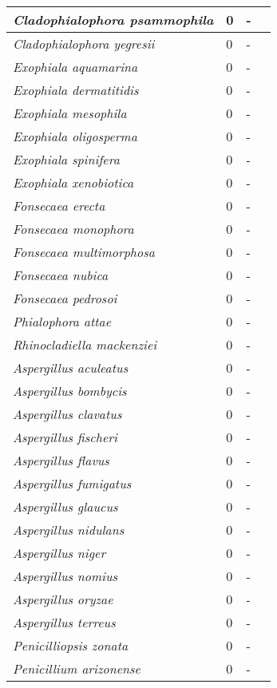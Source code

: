 {\begin{longtable}{| L{4cm} | L{2cm}  | L{5cm} | L{4cm} |}
\textit{Cladophialophora psammophila} & 0 & - & \\ \hline
\textit{Cladophialophora yegresii} & 0 & - & \\ \hline
\textit{Exophiala aquamarina} & 0 & - & \\ \hline
\textit{Exophiala dermatitidis} & 0 & - & \\ \hline
\textit{Exophiala mesophila} & 0 & - & \\ \hline
\textit{Exophiala oligosperma} & 0 & - & \\ \hline
\textit{Exophiala spinifera} & 0 & - & \\ \hline
\textit{Exophiala xenobiotica} & 0 & - & \\ \hline
\textit{Fonsecaea erecta} & 0 & - & \\ \hline
\textit{Fonsecaea monophora} & 0 & - & \\ \hline
\textit{Fonsecaea multimorphosa} & 0 & - & \\ \hline
\textit{Fonsecaea nubica} & 0 & - & \\ \hline
\textit{Fonsecaea pedrosoi} & 0 & - & \\ \hline
\textit{Phialophora attae} & 0 & - & \\ \hline
\textit{Rhinocladiella mackenziei} & 0 & - & \\ \hline
\textit{Aspergillus aculeatus} & 0 & - & \\ \hline
\textit{Aspergillus bombycis} & 0 & - & \\ \hline
\textit{Aspergillus clavatus} & 0 & - & \\ \hline
\textit{Aspergillus fischeri} & 0 & - & \\ \hline
\textit{Aspergillus flavus} & 0 & -& \\ \hline
\textit{Aspergillus fumigatus} & 0 & - & \\ \hline
\textit{Aspergillus glaucus} & 0 & - & \\ \hline
\textit{Aspergillus nidulans} & 0 & - & \\ \hline
\textit{Aspergillus niger} & 0 & - & \\ \hline
\textit{Aspergillus nomius} & 0 & - & \\ \hline
\textit{Aspergillus oryzae} & 0 & - & \\ \hline
\textit{Aspergillus terreus} & 0 & - & \\ \hline
\textit{Penicilliopsis zonata} & 0 & - & \\ \hline
\textit{Penicillium arizonense} & 0 & - & \\ \hline

\end{longtable}}
